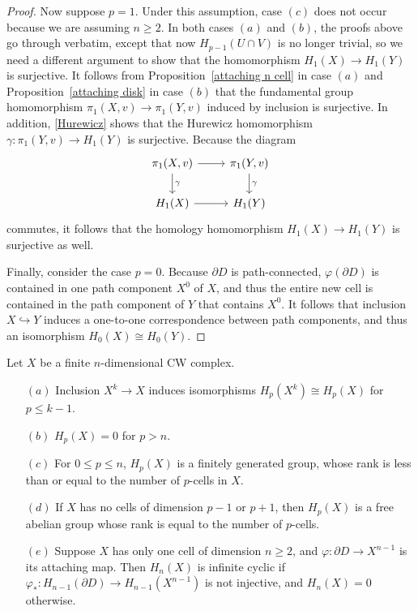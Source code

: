 \begin{proof}
Now suppose $p=1$. Under this assumption, case $(c)$ does not occur because we are assuming $n\geq 2$. In both cases $(a)$ and $(b)$, the proofs above go through verbatim, except that now $H_{p-1}(U\cap V)$ is no longer trivial, so we need a different argument
to show that the homomorphism $H_1(X)\to H_1(Y)$ is surjective. It follows from Proposition~\ref{attaching n cell} in case $(a)$ and Proposition~\ref{attaching disk} in case $(b)$ that the fundamental group homomorphism $\pi_1(X,v)\to\pi_1(Y,v)$ induced by inclusion is surjective. In addition, \cref{Hurewicz} shows that the Hurewicz homomorphism $\gamma:\pi_1(Y,v)\to H_1(Y)$ is surjective. Because the diagram
\[\begin{tikzcd}
\pi_1(X,v)\ar[d,"\gamma"]\ar[r]&\pi_1(Y,v)\ar[d,"\gamma"]\\
H_1(X)\ar[r]&H_1(Y)
\end{tikzcd}\]
commutes, it follows that the homology homomorphism $H_1(X)\to H_1(Y)$ is surjective as well.\par
Finally, consider the case $p=0$. Because $\partial D$ is path-connected, $\varphi(\partial D)$ is contained
in one path component $X^0$ of $X$, and thus the entire new cell is contained in the path component of $Y$ that contains $X^0$. It follows that inclusion $X\hookrightarrow Y$ induces a one-to-one correspondence between path components, and thus an isomorphism $H_0(X)\cong H_0(Y)$.
\end{proof}
\begin{theorem}\label{homology CW prop}
Let $X$ be a finite $n$-dimensional CW complex.
\begin{itemize}
\item[$(a)$]Inclusion $X^k\to X$ induces isomorphisms $H_p(X^k)\cong H_p(X)$ for $p\leq k-1$.
\item[$(b)$]$H_p(X)=0$ for $p>n$.
\item[$(c)$]For $0\leq p\leq n$, $H_p(X)$ is a finitely generated group, whose rank is less than or
equal to the number of $p$-cells in $X$.
\item[$(d)$]If $X$ has no cells of dimension $p-1$ or $p+1$, then $H_p(X)$ is a free abelian group whose rank is equal to the number of $p$-cells.
\item[$(e)$]Suppose $X$ has only one cell of dimension $n\geq 2$, and $\varphi:\partial D\to X^{n-1}$ is its attaching map. Then $H_n(X)$ is infinite cyclic if $\varphi_*:H_{n-1}(\partial D)\to H_{n-1}(X^{n-1})$ is
not injective, and $H_n(X)=0$ otherwise.
\end{itemize}
\end{theorem}
